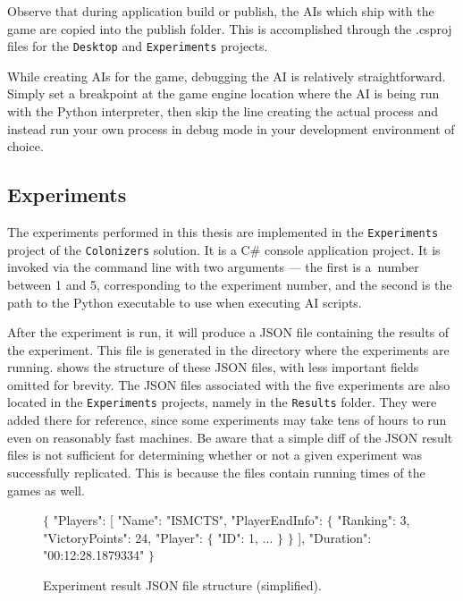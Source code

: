 Observe that during application build or publish, the AIs which ship with
the game are copied into the publish folder. This is accomplished through
the .csproj files for the \texttt{Desktop} and \texttt{Experiments} projects.

While creating AIs for the game, debugging the AI is relatively straightforward.
Simply set a breakpoint at the game engine location where the AI is being
run with the Python interpreter, then skip the line creating the actual process
and instead run your own process in debug mode in your development environment
of choice.

\subsection{Experiments}
\label{chap:experimentdocs}

The experiments performed in this thesis are implemented in the \texttt{Experiments}
project of the \texttt{Colonizers} solution. It is a C\# console application project.
It is invoked via the command line with two arguments --- the first is a~number
between 1 and 5, corresponding to the experiment number, and the second
is the path to the Python executable to use when executing AI scripts.

After the experiment is run, it will produce a JSON file containing the results
of the experiment. This file is generated in the directory where the experiments
are running.
 shows the structure of these JSON files, with less
important fields omitted for brevity. The JSON files associated with the five
experiments are also located in the \texttt{Experiments} projects, namely in
the \texttt{Results} folder. They were added there for reference, since
some experiments may take tens of hours to run even on reasonably fast
machines. Be aware that a simple diff of the JSON result files
is not sufficient for determining whether or not a given experiment was successfully
replicated. This is because the files contain running times of the games as well.

\begin{figure}[ht]
\begin{code}[commandchars=\\\{\},codes={\catcode`\$=3\catcode`\^=7\catcode`\_=8}]
$\{$
    "Players": [
        "Name": "ISMCTS",
        "PlayerEndInfo": $\{$
            "Ranking": 3,
            "VictoryPoints": 24,
            "Player": $\{$
                "ID": 1,
                ...
            $\}$
        $\}$
    ],
    "Duration": "00:12:28.1879334"
$\}$
\end{code}
\caption{Experiment result JSON file structure (simplified).}\label{dd:experimentjson}
\end{figure}

